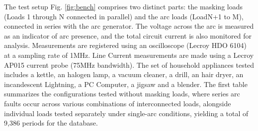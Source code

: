 \documentclass[journal,article,submit,moreauthors]{Definitions/mdpi}
\begin{document}
The test setup Fig. \ref{fig:bench} comprises two distinct parts: the masking loads (Loads 1 through N connected in parallel) and the arc loads (LoadN+1 to M), connected in series with the arc generator. The voltage across the arc is measured as an indicator of arc presence, and the total circuit current is also monitored for analysis. Measurements are registered using an oscilloscope (Lecroy HDO 6104) at a sampling rate of 1MHz. Line Current measurements are made using a Lecroy AP015 current probe (75MHz bandwidth).
The set of household appliances tested includes a kettle, an halogen lamp, a vacuum cleaner, a drill, 
an hair dryer, an incandescent Lightning, a PC Computer, a jigsaw and a blender. 
The first table summarizes the configurations tested without masking loads, where series arc faults occur across various combinations of interconnected loads, alongside individual loads tested separately under single-arc conditions, yielding a total of 9,386 periods for the database.

\begin{table}[htbp]
\centering
\caption{Experimental test configurations and load combinations without masking loads.}
\label{tab:load_combinations}
\end{table}
\end{document}

